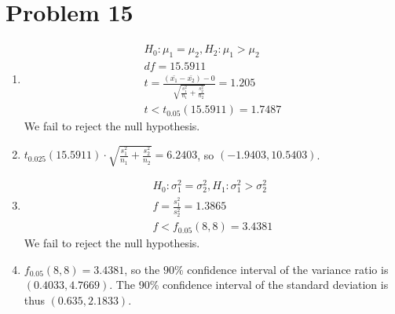 \documentclass{article}
\begin{document}
\section*{Problem 15}

\begin{enumerate}
	\item
		\begin{gather*}
			H_0: \mu_1 = \mu_2, H_2: \mu_1 > \mu_2 \\
			df = 15.5911 \\
			t = \frac{(\bar{x_1}-\bar{x_2})-0}{\sqrt{\frac{s_1^2}{n_1}+\frac{s_2^2}{n_2}}}
			= 1.205 \\
			t < t_{0.05}(15.5911) = 1.7487
		\end{gather*}
		We fail to reject the null hypothesis.
	\item $t_{0.025}(15.5911) \cdot \sqrt{\frac{s_1^2}{n_1}+\frac{s_2^2}{n_2}} = 6.2403$, so
		$(-1.9403, 10.5403)$.
	\item
		\begin{gather*}
			H_0: \sigma_1^2 = \sigma_2^2, H_1: \sigma_1^2 > \sigma_2^2 \\
			f = \frac{s_1^2}{s_2^2} = 1.3865 \\
			f < f_{0.05}(8, 8) = 3.4381
		\end{gather*}
		We fail to reject the null hypothesis.
	\item $f_{0.05}(8, 8) = 3.4381$, so the $90\%$ confidence interval of
		the variance ratio is $(0.4033, 4.7669)$. The 90\% confidence
		interval of the standard deviation is thus $(0.635, 2.1833)$.
\end{enumerate}
\end{document}
